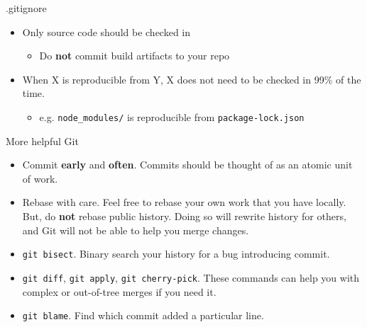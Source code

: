 \documentclass{beamer}
\begin{document}
\begin{frame}{.gitignore}
  \begin{itemize}
    \item Only source code should be checked in
      \begin{itemize}
        \item Do \textbf{not} commit build artifacts to your repo
      \end{itemize}
    \item When X is reproducible from Y, X does not need to be checked in 99\%
      of the time.
      \begin{itemize}
        \item e.g. \texttt{node\_modules/} is reproducible from
          \texttt{package-lock.json}
      \end{itemize}
  \end{itemize}
\end{frame}

\begin{frame}{More helpful Git}
  \begin{itemize}
    \item Commit \textbf{early} and \textbf{often}. Commits should be thought
      of as an atomic unit of work.
    \item Rebase with care. Feel free to rebase your own work that you have
      locally. But, do \textbf{not} rebase public history. Doing so will
      rewrite history for others, and Git will not be able to help you merge
      changes.
    \item \texttt{git bisect}. Binary search your history for a bug introducing
      commit.
    \item \texttt{git diff}, \texttt{git apply}, \texttt{git cherry-pick}.
      These commands can help you with complex or out-of-tree merges if you
      need it.
    \item \texttt{git blame}. Find which commit added a particular line.
  \end{itemize}
\end{frame}
\end{document}
